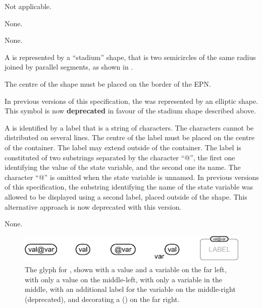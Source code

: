 \begin{glyphDescription}

\glyphSboTerm
Not applicable.

\glyphIncoming
None.

\glyphOutgoing
None.

\glyphContainer
A  is represented by a ``stadium'' shape, that is two semicircles of the same radius joined by parallel segments, as shown in .

The centre of the shape must be placed on the border of the EPN.

In previous versions of this specification, the  was represented by an elliptic shape.
This symbol is now \textbf{deprecated} in favour of the stadium shape described above.

\glyphLabel
A  is identified by a label that is a string of characters.
The characters cannot be distributed on several lines.
The centre of the label must be placed on the centre of the container.
The label may extend outside of the container.
The label is constituted of two substrings separated by the character ``@'', the first one identifying the value of the state variable, and the second one its name.
The character ``@'' is omitted when the state variable is unnamed.
In previous versions of this specification, the substring identifying the name of the state variable was allowed to be displayed using a second label, placed outside of the shape. This alternative approach is now deprecated with this version.

\glyphAux
None.

\end{glyphDescription}

\begin{figure}[H]
  \centering
  \includegraphics[width=1.0\textwidth]{images/build/state_variable.pdf}
  \caption{The \PD glyph for , shown with a value and a variable on the far left, with only a value on the middle-left, with only a variable in the middle, with an additional label for the variable on the middle-right (deprecated), and decorating a  () on the far right.}
  \label{fig:state-var}
\end{figure}

